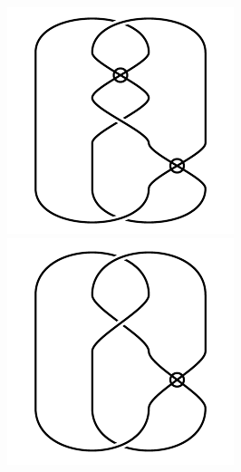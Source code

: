 \begin{figure}[H]
\begin{minipage}[b]{.18\linewidth}
\end{minipage}
\begin{minipage}[b]{.18\linewidth}
\centering
\includegraphics[width=\linewidth]{../data/virtual_3_1.png}
\end{minipage}
\begin{minipage}[b]{.18\linewidth}
\centering
\includegraphics[width=\linewidth]{../data/virtual_3_2.png}

\end{minipage}
\end{figure}
